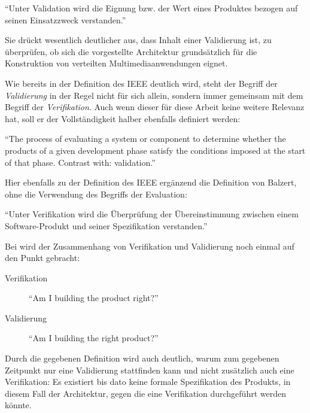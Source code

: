   \begin{definition}\label{def:validierung_balzert}
    "`Unter Validation wird die Eignung bzw. der Wert eines Produktes bezogen auf seinen Einsatzzweck verstanden."'~\emph{\citep[S. 101]{balzert1998lst}}
  \end{definition}
  
  Sie drückt wesentlich deutlicher aus, dass Inhalt einer Validierung ist, zu überprüfen, ob sich die vorgestellte Architektur grundsätzlich für die Konstruktion von verteilten Multimediaanwendungen eignet.
  
  Wie bereits in der Definition des IEEE deutlich wird, steht der Begriff der \emph{Validierung} in der Regel nicht für sich allein, sondern immer gemeinsam mit dem Begriff der \emph{Verifikation}. Auch wenn dieser für diese Arbeit keine weitere Relevanz hat, soll er der Vollständigkeit halber ebenfalls definiert werden:
  
  \begin{definition}\label{def:verifikation_ieee}
    "`The process of evaluating a system or component to determine whether the products of a given development phase satisfy the conditions imposed at the start of that phase. Contrast with: validation."'~\emph{\citep{ieee90sg}}
  \end{definition}
  
  Hier ebenfalls zu der Definition des IEEE ergänzend die Definition von Balzert, ohne die Verwendung des Begriffs der Evaluation:
  
  \begin{definition}\label{def:verifikation_balzert}
    "`Unter Verifikation wird die Überprüfung der Übereinstimmung zwischen einem Software-Produkt und seiner Spezifikation verstanden."'~\emph{\citep[S. 101]{balzert1998lst}}
  \end{definition}
  
  Bei \citep{boehm1984vv} wird der Zusammenhang von Verifikation und Validierung noch einmal auf den Punkt gebracht:
  
  \begin{description}
    \item[Verifikation] "`Am I building the product right?"' \citep[S. 75]{boehm1984vv}
    \item[Validierung] "`Am I building the right product?"' \citep[S. 75]{boehm1984vv}
  \end{description}
  
  Durch die gegebenen Definition wird auch deutlich, warum zum gegebenen Zeitpunkt nur eine Validierung stattfinden kann und nicht zusätzlich auch eine Verifikation: Es existiert bis dato keine formale Spezifikation des Produkts, in diesem Fall der Architektur, gegen die eine Verifikation durchgeführt werden könnte.
  

